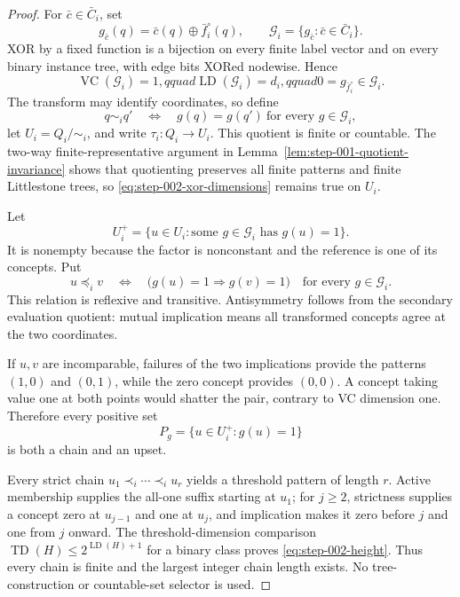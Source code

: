 \begin{proof}
For \(\bar c\in\bar C_i\), set
\begin{equation}\label{eq:step-002-xor-class}
g_{\bar c}(q)=\bar c(q)\oplus\bar f_i^\circ(q),
\qquad \mathcal G_i=\{g_{\bar c}:\bar c\in\bar C_i\}.
\end{equation}
XOR by a fixed function is a bijection on every finite label vector and on
every binary instance tree, with edge bits XORed nodewise.  Hence
\begin{equation}\label{eq:step-002-xor-dimensions}
\operatorname{VC}(\mathcal G_i)=1,qquad
\operatorname{LD}(\mathcal G_i)=d_i,qquad
0=g_{\bar f_i^\circ}\in\mathcal G_i.
\end{equation}
The transform may identify coordinates, so define
\[
q\sim_iq'\quad\Longleftrightarrow\quad
g(q)=g(q')\ \text{for every }g\in\mathcal G_i,
\]
let \(U_i=Q_i/{\sim_i}\), and write \(\tau_i:Q_i\to U_i\).  This quotient
is finite or countable.  The two-way finite-representative argument in
Lemma~\ref{lem:step-001-quotient-invariance} shows that quotienting preserves
all finite patterns and finite Littlestone trees, so
\eqref{eq:step-002-xor-dimensions} remains true on \(U_i\).

Let
\[
U_i^+=\{u\in U_i:\text{some }g\in\mathcal G_i\text{ has }g(u)=1\}.
\]
It is nonempty because the factor is nonconstant and the reference is one
of its concepts.  Put
\begin{equation}\label{eq:step-002-implication-order}
u\preceq_i v
\quad\Longleftrightarrow\quad
\bigl(g(u)=1\Longrightarrow g(v)=1\bigr)
\quad\text{for every }g\in\mathcal G_i.
\end{equation}
This relation is reflexive and transitive.  Antisymmetry follows from the
secondary evaluation quotient: mutual implication means all transformed
concepts agree at the two coordinates.

If \(u,v\) are incomparable, failures of the two implications provide the
patterns \((1,0)\) and \((0,1)\), while the zero concept provides
\((0,0)\).  A concept taking value one at both points would shatter the pair,
contrary to VC dimension one.  Therefore every positive set
\begin{equation}\label{eq:step-002-positive-set}
P_g=\{u\in U_i^+:g(u)=1\}
\end{equation}
is both a chain and an upset.

Every strict chain \(u_1\prec_i\cdots\prec_i u_r\) yields a threshold
pattern of length \(r\).  Active membership supplies the all-one suffix
starting at \(u_1\); for \(j\ge2\), strictness supplies a concept zero at
\(u_{j-1}\) and one at \(u_j\), and implication makes it zero before \(j\)
and one from \(j\) onward.  The threshold-dimension comparison
\(\operatorname{TD}(H)\le2^{\operatorname{LD}(H)+1}\) for a binary class
\citep{yan2025vc1} proves \eqref{eq:step-002-height}.  Thus every chain is
finite and the largest integer chain length exists.  No tree-construction
or countable-set selector is used.


\end{proof}

